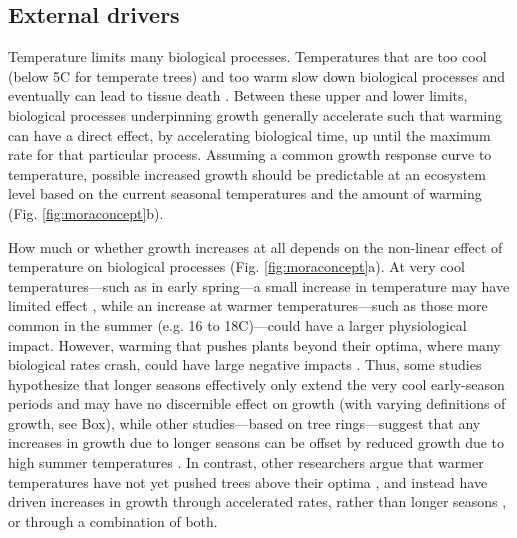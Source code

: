 \documentclass[11pt]{article}
\newcommand{\R}[1]{\label{#1}\linelabel{#1}}
\begin{document}
\subsection*{External drivers}

\R{R2rate1S}Temperature limits many biological processes. Temperatures that are too cool (below 5\degree C for temperate trees) and too warm \citep[an area of active research, but likely between 35-45\degree C;][]{martinez2008hot,cabon2022cross} slow down biological processes and eventually can lead to tissue death \citep[see Fig. \ref{fig:moraconcept}a,][]{larcher1980,kramer2012book}. Between these upper and lower limits, biological processes underpinning growth generally accelerate such that warming can have a direct effect, by accelerating biological time, up until the maximum rate for that particular process. Assuming a common growth response curve to temperature, possible increased growth should be predictable at an ecosystem level based on the current seasonal temperatures and the amount of warming (Fig. \ref{fig:moraconcept}b). 

How much or whether growth increases at all depends on the non-linear effect of temperature on biological processes (Fig. \ref{fig:moraconcept}a). At very cool temperatures---such as in early spring---a small increase in temperature may have limited effect \citep[or even increase frost risk through early budburst, Fig. \ref{fig:hypotheses}e,][]{cat2021pep}, while an increase at warmer temperatures---such as those more common in the summer (e.g. 16 to 18\degree C)---could have a larger physiological impact. However, warming that pushes plants beyond their optima, where many biological rates crash, could have large negative impacts \citep{nobel1983biophysical,leuning2002temperature}. Thus, some studies hypothesize that longer seasons effectively only extend the very cool early-season periods and may have no discernible effect on growth (with varying definitions of growth, see Box)\R{R1box1}, while other studies---based on tree rings---suggest that any increases in growth due to longer seasons can be offset by reduced growth due to high summer temperatures \citep[Fig. \ref{fig:hypotheses},][]{gantois2022new,dow2022warm}. In contrast, other researchers argue that warmer temperatures have not yet pushed trees above their optima \citep{schaber2002evaluation}, and instead have driven increases in growth through accelerated rates, rather than longer seasons \citep[e.g.][]{ren2019}, or through a combination of both.\R{R2rate1E}
\end{document}
